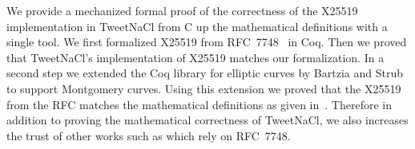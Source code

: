 We provide a mechanized formal proof of the correctness of the X25519
implementation in TweetNaCl from C up the mathematical definitions with a single tool.
We first formalized X25519 from RFC~7748~\cite{rfc7748} in Coq.
Then we proved that TweetNaCl's implementation of X25519 matches our formalization.
In a second step we extended the Coq library for elliptic curves \cite{BartziaS14}
by Bartzia and Strub to support Montgomery curves.
Using this extension we proved that the X25519 from the RFC matches the
mathematical definitions as given in~\cite[Sec.~2]{Ber06}.
Therefore in addition to proving the mathematical correctness of TweetNaCl,
we also increases the trust of other works such as
\cite{zinzindohoue2017hacl,Erbsen2016SystematicSO} which rely on RFC~7748.

